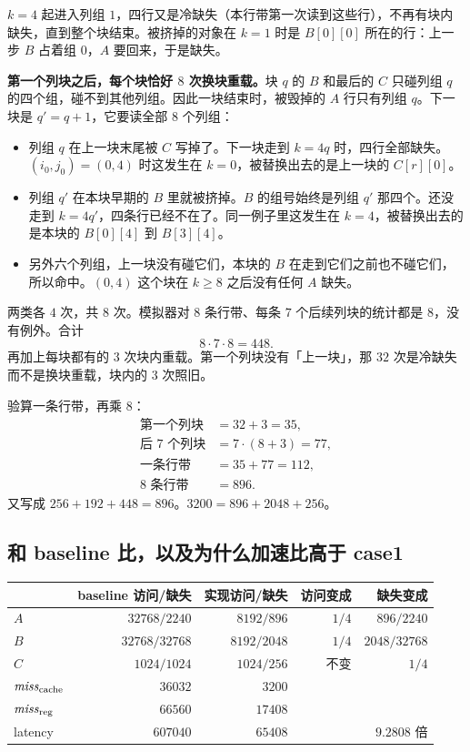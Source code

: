 $k=4$ 起进入列组 $1$，四行又是冷缺失（本行带第一次读到这些行），不再有块内缺失，直到整个块结束。被挤掉的对象在 $k=1$ 时是 $B[0][0]$ 所在的行：上一步 $B$ 占着组 $0$，$A$ 要回来，于是缺失。

\textbf{第一个列块之后，每个块恰好 $8$ 次换块重载。}块 $q$ 的 $B$ 和最后的 $C$ 只碰列组 $q$ 的四个组，碰不到其他列组。因此一块结束时，被毁掉的 $A$ 行只有列组 $q$。下一块是 $q'=q+1$，它要读全部 $8$ 个列组：

\begin{itemize}
  \item 列组 $q$ 在上一块末尾被 $C$ 写掉了。下一块走到 $k=4q$ 时，四行全部缺失。$(i_0,j_0)=(0,4)$ 时这发生在 $k=0$，被替换出去的是上一块的 $C[r][0]$。
  \item 列组 $q'$ 在本块早期的 $B$ 里就被挤掉。$B$ 的组号始终是列组 $q'$ 那四个。还没走到 $k=4q'$，四条行已经不在了。同一例子里这发生在 $k=4$，被替换出去的是本块的 $B[0][4]$ 到 $B[3][4]$。
  \item 另外六个列组，上一块没有碰它们，本块的 $B$ 在走到它们之前也不碰它们，所以命中。$(0,4)$ 这个块在 $k\ge 8$ 之后没有任何 $A$ 缺失。
\end{itemize}

两类各 $4$ 次，共 $8$ 次。模拟器对 $8$ 条行带、每条 $7$ 个后续列块的统计都是 $8$，没有例外。合计
\[
8\cdot7\cdot8=448.
\]
再加上每块都有的 $3$ 次块内重载。第一个列块没有「上一块」，那 $32$ 次是冷缺失而不是换块重载，块内的 $3$ 次照旧。

验算一条行带，再乘 $8$：
\begin{align*}
\text{第一个列块}&=32+3=35,\\
\text{后 }7\text{ 个列块}&=7\cdot(8+3)=77,\\
\text{一条行带}&=35+77=112,\\
8\text{ 条行带}&=896.
\end{align*}
又写成 $256+192+448=896$。$3200=896+2048+256$。

\subsection{和 baseline 比，以及为什么加速比高于 case1}

\begin{center}
\small
\begin{tabular}{@{}lrrrr@{}}
\toprule
 & baseline 访问/缺失 & 实现访问/缺失 & 访问变成 & 缺失变成\\
\midrule
$A$ & $32768/2240$ & $8192/896$ & $1/4$ & $896/2240$\\
$B$ & $32768/32768$ & $8192/2048$ & $1/4$ & $2048/32768$\\
$C$ & $1024/1024$ & $1024/256$ & 不变 & $1/4$\\
$\mathit{miss}_{\mathrm{cache}}$ & $36032$ & $3200$ &  & \\
$\mathit{miss}_{\mathrm{reg}}$ & $66560$ & $17408$ &  & \\
latency & $607040$ & $65408$ &  & $9.2808$ 倍\\
\bottomrule
\end{tabular}
\end{center}

